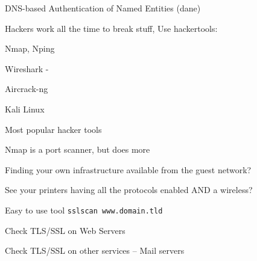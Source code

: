 \documentclass[Screen16to9,17pt]{foils}
\begin{document}
\begin{list1}
\item DNS-based Authentication of Named Entities (dane)
\end{list1}






\begin{list2}
\item Hackers work all the time to break stuff, Use hackertools:
\item Nmap, Nping 
\item Wireshark - 
\item Aircrack-ng 
\item Kali Linux 
\end{list2}

\vskip 5mm
\centerline{Most popular hacker tools }





\begin{list2}
\item Nmap is a port scanner, but does more
\item Finding your own infrastructure available from the guest network?
\item See your printers having all the protocols enabled AND a wireless?
\end{list2}


\begin{list2}
\item Easy to use tool \verb+sslscan www.domain.tld+
\item Check TLS/SSL on Web Servers
\item Check TLS/SSL on other services -- Mail servers
\end{list2}


\end{document}
